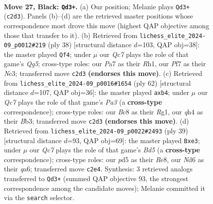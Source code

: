 \documentclass[11pt]{article}
\begin{document}
\clearpage

\begin{figure}[p]\centering
\begin{subfigure}{0.46\textwidth}\centering
\resizebox{\linewidth}{!}{%
\newchessgame
\chessboard[
  setfen={r1b5/ppp2ppk/3n3p/3P4/B6Q/2b2P1P/PPq3P1/R1B2K2 b - - 1 27},
  showmover=false,
  pgfstyle=straightmove, color=movearrow, markmove={c2-d3}
]}
\caption{}
\end{subfigure}\hfill
\begin{subfigure}{0.46\textwidth}\centering
\resizebox{\linewidth}{!}{%
\newchessgame
\chessboard[
  setfen={r6r/pp2p1k1/2p2pp1/q4bQP/3Pp3/2N5/PPP1B3/2K4R w - - 0 20},
  showmover=false,
  pgfstyle=straightmove, color=movearrow, markmove={g5-f4}
]}
\caption{}
\end{subfigure}
\\[4pt]
\begin{subfigure}{0.46\textwidth}\centering
\resizebox{\linewidth}{!}{%
\newchessgame
\chessboard[
  setfen={4rbk1/4qp1p/6pP/1pN2bP1/1p6/PBBP1Q2/3K1P2/6R1 w - - 0 32},
  showmover=false,
  pgfstyle=straightmove, color=movearrow, markmove={a3-b4}
]}
\caption{}
\end{subfigure}\hfill
\begin{subfigure}{0.46\textwidth}\centering
\resizebox{\linewidth}{!}{%
\newchessgame
\chessboard[
  setfen={4r1k1/2p2ppp/Q1Pq1n2/8/3bp3/1BN1B2b/1PP2PP1/4R1K1 b - - 1 20},
  showmover=false,
  pgfstyle=straightmove, color=movearrow, markmove={d4-e3}
]}
\caption{}
\end{subfigure}
\caption{\textbf{Move 27, Black: \texttt{Qd3+}.} (a) Our position; Melanie plays \texttt{Qd3+} (\texttt{c2d3}). Panels (b)--(d) are the retrieved master positions whose correspondence most drove this move (highest QAP objective among those that transfer to it). (b) Retrieved from \texttt{lichess\_elite\_2024-09\_p0012\#219} (ply 38) [structural distance $d$=103, QAP obj=38]: the master played \texttt{Qf4}; under $\mu$ our \emph{Qc7} plays the role of that game's \emph{Qg5}; cross-type roles: our \emph{P}a7 as their \emph{R}h1, our \emph{P}f7 as their \emph{N}c3; transferred move \texttt{c2d3} \textbf{(endorses this move)}. (c) Retrieved from \texttt{lichess\_elite\_2024-09\_p0016\#1654} (ply 62) [structural distance $d$=107, QAP obj=36]: the master played \texttt{axb4}; under $\mu$ our \emph{Qc7} plays the role of that game's \emph{Pa3} (a \textbf{cross-type} correspondence); cross-type roles: our \emph{B}c8 as their \emph{R}g1, our \emph{q}h4 as their \emph{B}b3; transferred move \texttt{c2d3} \textbf{(endorses this move)}. (d) Retrieved from \texttt{lichess\_elite\_2024-09\_p0022\#2493} (ply 39) [structural distance $d$=93, QAP obj=69]: the master played \texttt{Bxe3}; under $\mu$ our \emph{Qc7} plays the role of that game's \emph{Bd5} (a \textbf{cross-type} correspondence); cross-type roles: our \emph{p}d5 as their \emph{R}e8, our \emph{N}d6 as their \emph{q}a6; transferred move \texttt{c2e4}. Synthesis: 3 retrieved analogs transferred to \texttt{Qd3+} (summed QAP objective 93, the strongest correspondence among the candidate moves); Melanie committed it via the \texttt{search} selector.}
\label{fig:thought-m53}
\end{figure}
\end{document}

